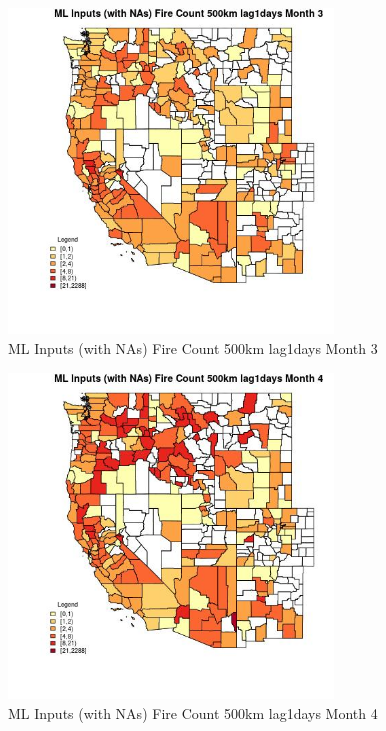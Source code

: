 \begin{figure} 
\centering  
\includegraphics[width=0.77\textwidth]{Code_Outputs/Report_ML_input_PM25_Step4_part_e_de_duplicated_aves_compiled_2019-05-21wNAs_CountyFire_Count_500km_lag1daysmedianMonth3.jpg} 
\caption{\label{fig:Report_ML_input_PM25_Step4_part_e_de_duplicated_aves_compiled_2019-05-21wNAsCountyFire_Count_500km_lag1daysmedianMonth3}ML Inputs (with NAs) Fire Count 500km lag1days Month 3} 
\end{figure} 
 

\begin{figure} 
\centering  
\includegraphics[width=0.77\textwidth]{Code_Outputs/Report_ML_input_PM25_Step4_part_e_de_duplicated_aves_compiled_2019-05-21wNAs_CountyFire_Count_500km_lag1daysmedianMonth4.jpg} 
\caption{\label{fig:Report_ML_input_PM25_Step4_part_e_de_duplicated_aves_compiled_2019-05-21wNAsCountyFire_Count_500km_lag1daysmedianMonth4}ML Inputs (with NAs) Fire Count 500km lag1days Month 4} 
\end{figure} 
 

